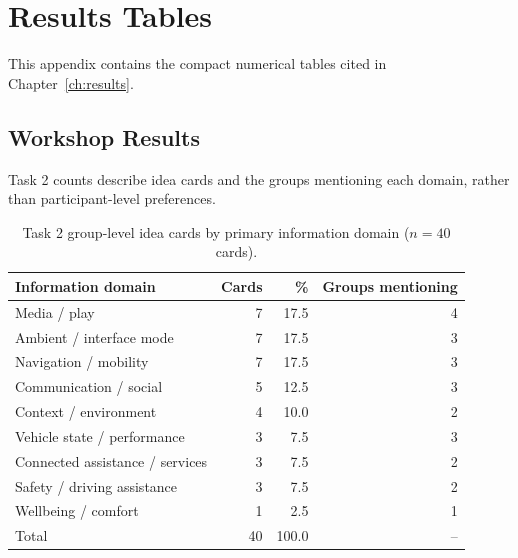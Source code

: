 \documentclass[
english,                 %
bibtex,                  %
includeExtraAbstracts, %
]{kththesis}
\newenvironment{evidenceblock}{\par\addvspace{6pt}\noindent\begin{minipage}{\linewidth}}{\end{minipage}\par\addvspace{6pt}}
\numberwithin{listing}{chapter}
\begin{document}
\chapter{Results Tables}
\label{app:results-tables}

This appendix contains the compact numerical tables cited in Chapter~\ref{ch:results}.

\section{Workshop Results}
\label{app:workshop-results}

\begin{evidenceblock}
\normalsize
Task 2 counts describe idea cards and the groups mentioning each domain, rather than participant-level preferences.

\begin{table}[H]
\centering
\scriptsize
\caption[Task 2 ideas by information domain]{Task 2 group-level idea cards by primary information domain ($n = 40$ cards).}
\label{tab:workshop-t2-domains}
\begin{tabularx}{\textwidth}{@{}>{\raggedright\arraybackslash}Xrrr@{}}
\toprule
Information domain & Cards & \% & Groups mentioning \\
\midrule
Media / play & 7 & 17.5 & 4 \\
Ambient / interface mode & 7 & 17.5 & 3 \\
Navigation / mobility & 7 & 17.5 & 3 \\
Communication / social & 5 & 12.5 & 3 \\
Context / environment & 4 & 10.0 & 2 \\
Vehicle state / performance & 3 & 7.5 & 3 \\
Connected assistance / services & 3 & 7.5 & 2 \\
Safety / driving assistance & 3 & 7.5 & 2 \\
Wellbeing / comfort & 1 & 2.5 & 1 \\
\midrule
Total & 40 & 100.0 & -- \\
\bottomrule
\end{tabularx}
\end{table}
\end{evidenceblock}
\end{document}
